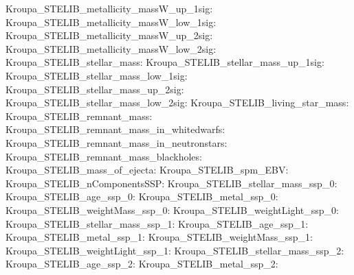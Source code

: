 Kroupa\_STELIB\_metallicity\_massW\_up\_1sig:  \newline 
Kroupa\_STELIB\_metallicity\_massW\_low\_1sig:  \newline 
Kroupa\_STELIB\_metallicity\_massW\_up\_2sig:  \newline 
Kroupa\_STELIB\_metallicity\_massW\_low\_2sig:  \newline 
Kroupa\_STELIB\_stellar\_mass:  \newline 
Kroupa\_STELIB\_stellar\_mass\_up\_1sig:  \newline 
Kroupa\_STELIB\_stellar\_mass\_low\_1sig:  \newline 
Kroupa\_STELIB\_stellar\_mass\_up\_2sig:  \newline 
Kroupa\_STELIB\_stellar\_mass\_low\_2sig:  \newline 
Kroupa\_STELIB\_living\_star\_mass:  \newline 
Kroupa\_STELIB\_remnant\_mass:  \newline 
Kroupa\_STELIB\_remnant\_mass\_in\_whitedwarfs:  \newline 
Kroupa\_STELIB\_remnant\_mass\_in\_neutronstars:  \newline 
Kroupa\_STELIB\_remnant\_mass\_blackholes:  \newline 
Kroupa\_STELIB\_mass\_of\_ejecta:  \newline 
Kroupa\_STELIB\_spm\_EBV:  \newline 
Kroupa\_STELIB\_nComponentsSSP:  \newline 
Kroupa\_STELIB\_stellar\_mass\_ssp\_0:  \newline 
Kroupa\_STELIB\_age\_ssp\_0:  \newline 
Kroupa\_STELIB\_metal\_ssp\_0:  \newline 
Kroupa\_STELIB\_weightMass\_ssp\_0:  \newline 
Kroupa\_STELIB\_weightLight\_ssp\_0:  \newline 
Kroupa\_STELIB\_stellar\_mass\_ssp\_1:  \newline 
Kroupa\_STELIB\_age\_ssp\_1:  \newline 
Kroupa\_STELIB\_metal\_ssp\_1:  \newline 
Kroupa\_STELIB\_weightMass\_ssp\_1:  \newline 
Kroupa\_STELIB\_weightLight\_ssp\_1:  \newline 
Kroupa\_STELIB\_stellar\_mass\_ssp\_2:  \newline 
Kroupa\_STELIB\_age\_ssp\_2:  \newline 
Kroupa\_STELIB\_metal\_ssp\_2:  \newline 
